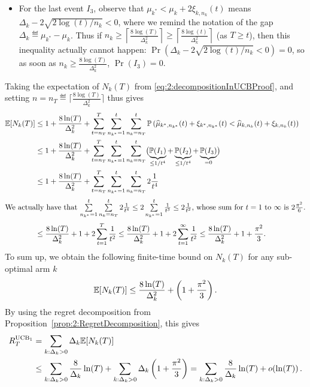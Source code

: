 \begin{smallproof}
\begin{itemize}
        \item
        For the last event $I_3$,
        observe that $\mu_{k^*} < \mu_k + 2 \xi_{k,n_k}(t)$ means $\Delta_k - 2 \sqrt{2\log(t) / n_k} < 0$, where we remind the notation of the gap $\Delta_k \eqdef \mu_{k^*} - \mu_k$.
        Thus if $n_k \geq \left\lceil \frac{8 \log(T)}{\Delta_k^2} \right\rceil \geq \left\lceil \frac{8 \log(t)}{\Delta_k^2} \right\rceil$ (as $T \geq t$),
        then this inequality actually cannot happen:
        $\Pr(\Delta_k - 2 \sqrt{2\log(t) / n_k} < 0) = 0$,
        so as soon as $n_k \geq \frac{8 \log(T)}{\Delta_k^2}$, $\Pr(I_3) = 0$.
    \end{itemize}
    Taking the expectation of $N_k(T)$ from \eqref{eq:2:decompositionInUCBProof},
    and setting $n = n_T \eqdef \lceil \frac{8 \log(T)}{\Delta_k^2} \rceil$ thus gives
    \begin{align}\label{eq:2:decompositionInUCBProof3}
        \mathbb{E}[ N_k(T) ]
        & \leq 1 + \frac{8 \ln(T)}{\Delta_k^2} + \sum_{t=n_T}^T \sum_{n_{k^*}=1}^t \sum_{n_{k}=n_T}^t  \mathbb{P}\left( \widehat{\mu}_{k^*,n_{k^*}}(t) + \xi_{k^*,n_{k^*}}(t) < \widehat{\mu}_{k,n_k}(t) + \xi_{k,n_k}(t) \right) \nonumber \\
        & \leq 1 + \frac{8 \ln(T)}{\Delta_k^2} + \sum_{t=n_T}^T \sum_{n_{k^*}=1}^t \sum_{n_{k}=n_T}^t \bigl( \underbrace{\mathbb{P}(I_1)}_{\leq 1/t^4} + \underbrace{\mathbb{P}(I_2)}_{\leq 1/t^4} + \underbrace{\mathbb{P}(I_3)}_{=0} \bigr) \nonumber \\
        & \leq 1 + \frac{8 \ln(T)}{\Delta_k^2} + \sum_{t=n_T}^T \sum_{n_{k^*}=1}^t \sum_{n_{k}=n_T}^t  2 \frac{1}{t^4} \nonumber \\
        \intertext{We actually have that $\sum\limits_{n_{k^*}=1}^t \sum\limits_{n_{k}=n_T}^t  2 \frac{1}{t^4} \leq 2 \sum\limits_{n_{k^*}=1}^t \frac{1}{t^3} \leq 2 \frac{1}{t^2}$, whose sum for $t=1$ to $\infty$ is $2\frac{\pi^2}{6}$.}
        & \leq \frac{8 \ln(T)}{\Delta_k^2} + 1 + 2 \sum_{t=1}^T \frac{1}{t^2}
        \leq \frac{8 \ln(T)}{\Delta_k^2} + 1 + 2 \sum_{t=1}^{\infty} \frac{1}{t^2}
        \leq \frac{8 \ln(T)}{\Delta_k^2} + 1 + \frac{\pi^2}{3}.
    \end{align}
    To sum up, we obtain the following finite-time bound on $N_k(T)$ for any sub-optimal arm $k$
    \begin{align*}
        \mathbb{E}[N_k(T)] \leq \frac{8 \ln(T)}{\Delta_k^2} + \left(1 + \frac{\pi^2}{3}\right).
    \end{align*}
    By using the regret decomposition from Proposition~\ref{prop:2:RegretDecomposition}, this gives
    \begin{align*}
        R_T^{\mathrm{UCB}_1} &= \sum_{k: \Delta_k>0} \Delta_k \mathbb{E}[N_k(T)] \\
        & \leq \sum_{k: \Delta_k>0} \frac{8}{\Delta_k} \ln(T) + \sum_{k: \Delta_k>0} \Delta_k \left( 1 + \frac{\pi^2}{3} \right)
        = \sum_{k: \Delta_k>0} \frac{8}{\Delta_k} \ln(T) + \mathop{}\mathopen{}o\mathopen{}\left(\ln(T)\right).
    \end{align*}
\end{smallproof}

